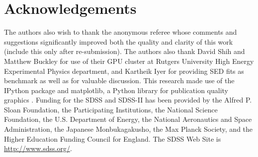 \documentclass[fleqn,usenatbib]{mnras}
\begin{document}
\section*{Acknowledgements}
 The authors also wish to thank the anonymous referee whose comments and suggestions significantly improved both the quality and clarity of this work (include this only after re-submission).
 The authors also thank David Shih and Matthew Buckley for use of their GPU cluster at Rutgers University High Energy Experimental Physics department, and Kartheik Iyer for providing SED fits as benchmark as well as for valuable discussion.
 This research made use of the {\sc IPython} package \citep{Perez2007} and {\sc matplotlib}, a Python library for publication quality graphics \citep{Hunter2007}. Funding for the SDSS and SDSS-II has been provided by the Alfred P. Sloan Foundation, the Participating Institutions, the National Science Foundation, the U.S. Department of Energy, the National Aeronautics and Space Administration, the Japanese Monbukagakusho, the Max Planck Society, and the Higher Education Funding Council for England. The SDSS Web Site is \url{http://www.sdss.org/}.



%
%

\bsp	%
\label{lastpage}
\end{document}
